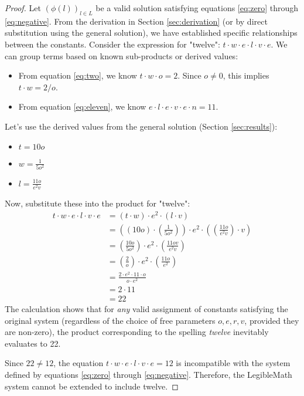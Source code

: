 \documentclass[12pt,a4paper]{article}
\theoremstyle{plain}
\theoremstyle{definition}
\begin{document}
\begin{proof}
Let $(\phi(l))_{l \in L}$ be a valid solution satisfying equations \eqref{eq:zero} through \eqref{eq:negative}. From the derivation in Section \ref{sec:derivation} (or by direct substitution using the general solution), we have established specific relationships between the constants. Consider the expression for "twelve": $t \cdot w \cdot e \cdot l \cdot v \cdot e$.
We can group terms based on known sub-products or derived values:
\begin{itemize}
    \item From equation \eqref{eq:two}, we know $t \cdot w \cdot o = 2$. Since $o \neq 0$, this implies $t \cdot w = 2/o$.
    \item From equation \eqref{eq:eleven}, we know $e \cdot l \cdot e \cdot v \cdot e \cdot n = 11$.
\end{itemize}
Let's use the derived values from the general solution (Section \ref{sec:results}):
\begin{itemize}
    \item $t = 10o$
    \item $w = \frac{1}{5o^2}$
    \item $l = \frac{11o}{e^2v}$
\end{itemize}
Now, substitute these into the product for "twelve":
\begin{align*}
t \cdot w \cdot e \cdot l \cdot v \cdot e &= (t \cdot w) \cdot e^2 \cdot (l \cdot v) \\
&= \left( (10o) \cdot \left(\frac{1}{5o^2}\right) \right) \cdot e^2 \cdot \left( \left(\frac{11o}{e^2v}\right) \cdot v \right) \\
&= \left( \frac{10o}{5o^2} \right) \cdot e^2 \cdot \left( \frac{11o v}{e^2 v} \right) \\
&= \left( \frac{2}{o} \right) \cdot e^2 \cdot \left( \frac{11o}{e^2} \right) \\
&= \frac{2 \cdot e^2 \cdot 11 \cdot o}{o \cdot e^2} \\
&= 2 \cdot 11 \\
&= 22
\end{align*}
The calculation shows that for \emph{any} valid assignment of constants satisfying the original system (regardless of the choice of free parameters $o, e, r, v$, provided they are non-zero), the product corresponding to the spelling \emph{twelve} inevitably evaluates to 22.

Since $22 \neq 12$, the equation $t \cdot w \cdot e \cdot l \cdot v \cdot e = 12$ is incompatible with the system defined by equations \eqref{eq:zero} through \eqref{eq:negative}. Therefore, the LegibleMath system cannot be extended to include twelve.
\end{proof}
\end{document}
